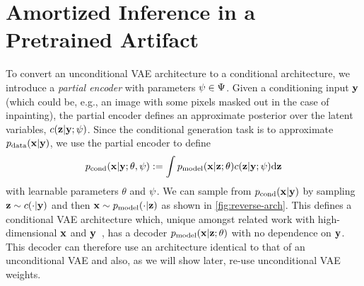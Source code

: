 \section{Amortized Inference in a Pretrained Artifact}
To convert an unconditional VAE architecture to a conditional architecture, we
introduce a \textit{partial encoder} with parameters $\psi{}\in\Psi{}$.
%
%
Given a conditioning input $\mathbf{y}{}$ (which could be, e.g., an image with some
pixels masked out in the case of inpainting), the partial encoder defines an
approximate posterior over the latent variables,
$c{}(\mathbf{z}{}|\mathbf{y}{}; \psi)$.
%
Since the conditional generation task is
to approximate $p_{\rm{data}}{}(\mathbf{x}{}|\mathbf{y}{})$, we use the partial encoder to define
\begin{equation}
  \label{eq:marginal-image-posterior}
  p_{\text{cond}}{}(\mathbf{x}{}|\mathbf{y}{}; \theta, \psi) := \int p_{\rm{model}}{}(\mathbf{x}{}|\mathbf{z}{}; \theta)c{}(\mathbf{z}{}|\mathbf{y}{}; \psi) \mathrm{d}\mathbf{z}{}
\end{equation}
with learnable parameters $\theta$ and $\psi$. We can sample from
$p_{\text{cond}}{}(\mathbf{x}{}|\mathbf{y}{})$ by sampling $\mathbf{z}{}\sim c{}(\cdot|\mathbf{y}{})$ and then
$\mathbf{x}{}\sim p_{\rm{model}}{}(\cdot|\mathbf{z}{})$ as shown in \cref{fig:reverse-arch}. This defines
a conditional VAE architecture which, unique amongst related work with
high-dimensional $\mathbf{x}{}$ and
$\mathbf{y}{}$~\citep{sohn2015learning,zheng2019pluralistic,ivanov2018variational,wan2021high},
has a decoder $p_{\rm{model}}{}(\mathbf{x}{}|\mathbf{z}{}; \theta)$ with no dependence on $\mathbf{y}{}$. This
decoder can therefore use an architecture identical to that of an unconditional
VAE and also, as we will show later, re-use unconditional VAE weights.

